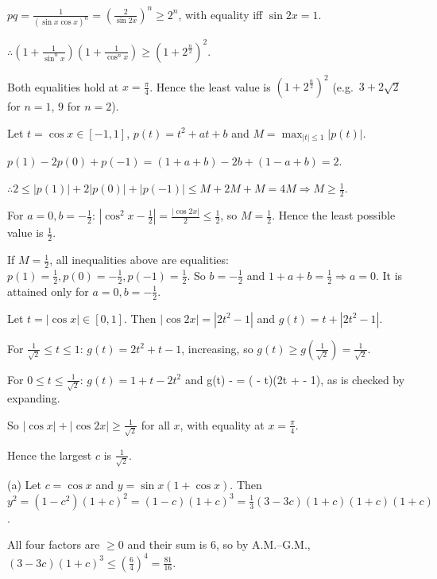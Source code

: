   $pq = \frac{1}{(\sin x\cos x)^n} = \left(\frac{2}{\sin2x}\right)^n\ge 2^n$, with equality iff $\sin2x = 1$.

  $\therefore\left(1 + \frac{1}{\sin^nx}\right)\left(1 + \frac{1}{\cos^nx}\right)\ge\left(1 + 2^{\frac{n}{2}}\right)^2$.

  Both equalities hold at $x = \frac{\pi}{4}$. Hence the least value is $\left(1 + 2^{\frac{n}{2}}\right)^2$ (e.g.\ $3
  + 2\sqrt{2}$ for $n = 1$, $9$ for $n = 2$).
\item Let $t = \cos x\in[-1, 1]$, $p(t) = t^2 + at + b$ and $M = \max_{|t|\le 1}|p(t)|$.

  $p(1) - 2p(0) + p(-1) = (1 + a + b) - 2b + (1 - a + b) = 2$.

  $\therefore 2\le|p(1)| + 2|p(0)| + |p(-1)|\le M + 2M + M = 4M\Rightarrow M\ge\frac{1}{2}$.

  For $a = 0, b = -\frac{1}{2}$: $\left|\cos^2x - \frac{1}{2}\right| = \frac{|\cos2x|}{2}\le\frac{1}{2}$, so $M =
  \frac{1}{2}$. Hence the least possible value is $\frac{1}{2}$.

  If $M = \frac{1}{2}$, all inequalities above are equalities: $p(1) = \frac{1}{2}, p(0) = -\frac{1}{2}, p(-1) =
  \frac{1}{2}$. So $b = -\frac{1}{2}$ and $1 + a + b = \frac{1}{2}\Rightarrow a = 0$. It is attained only for $a = 0,
  b = -\frac{1}{2}$.
\item Let $t = |\cos x|\in[0, 1]$. Then $|\cos2x| = |2t^2 - 1|$ and $g(t) = t + |2t^2 - 1|$.

  For $\frac{1}{\sqrt{2}}\le t\le 1$: $g(t) = 2t^2 + t - 1$, increasing, so $g(t)\ge
  g\left(\frac{1}{\sqrt{2}}\right) = \frac{1}{\sqrt{2}}$.

  For $0\le t\le\frac{1}{\sqrt{2}}$: $g(t) = 1 + t - 2t^2$ and
  \startformula
    g(t) -  = \left( - t\right)\left(2t +  - 1\right),
  \stopformula
  as is checked by expanding.

  So $|\cos x| + |\cos2x|\ge\frac{1}{\sqrt{2}}$ for all $x$, with equality at $x = \frac{\pi}{4}$.

  Hence the largest $c$ is $\frac{1}{\sqrt{2}}$.
\item (a) Let $c = \cos x$ and $y = \sin x(1 + \cos x)$. Then $y^2 = (1 - c^2)(1 + c)^2 = (1 - c)(1 + c)^3 =
  \frac{1}{3}(3 - 3c)(1 + c)(1 + c)(1 + c)$.

  All four factors are $\ge 0$ and their sum is $6$, so by A.M.--G.M., $(3 - 3c)(1 + c)^3\le\left(\frac{6}{4}\right)^4
  = \frac{81}{16}$.

